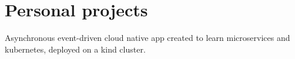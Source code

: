 \documentclass[]{font}
\begin{document}
\begin{minipage}[t]{0.66\textwidth}



\sectionsep



\section{Personal projects}

Asynchronous event-driven cloud native app created to learn microservices and kubernetes, deployed on a kind cluster.
\sectionsep




\end{minipage} 
\end{document}
